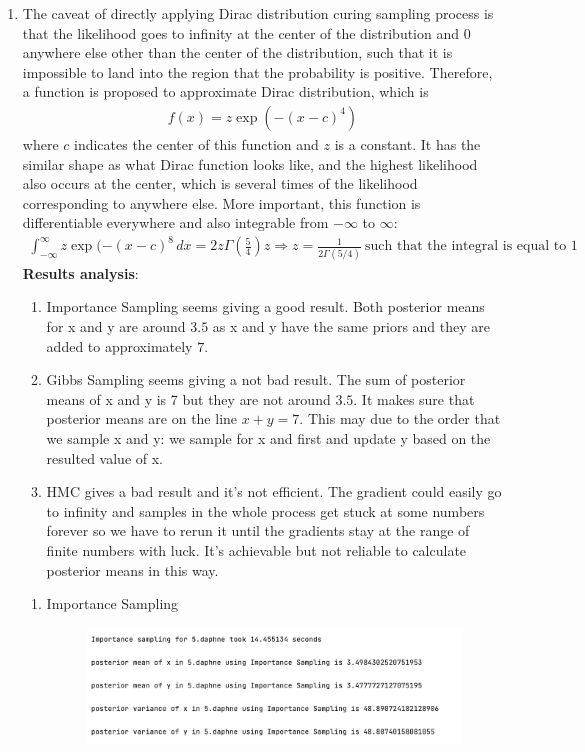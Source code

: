 \documentclass{article}
\begin{document}
\begin{enumerate}
\begin{enumerate}
\end{enumerate}
\newpage
\item The caveat of directly applying Dirac distribution curing sampling process is that the likelihood goes to infinity at the center of the distribution and 0 anywhere else other than the center of the distribution,  such that it is impossible to land into the region that the probability is positive. Therefore,  a function is proposed to approximate Dirac distribution,  which is 
\begin{align*}
f(x) = z\exp(-(x-c)^4)
\end{align*}
where $c$ indicates the center of this function and $z$ is a constant.  It has the similar shape as what Dirac function looks like,  and the highest likelihood also occurs at the center, which is several times of the likelihood corresponding to anywhere else.  More important, this function is differentiable everywhere and also integrable from $-\infty$ to $\infty$:
\begin{align*}
\int_{-\infty}^\infty z\exp(-(x - c)^8\,dx = 2z\Gamma\left(\frac 54\right)z\Rightarrow z = \frac{1}{2\Gamma(5/4)}\ \text{such that the integral is equal to 1}
\end{align*} 
\textbf{Results analysis}: 
\begin{enumerate}
\item Importance Sampling seems giving a good result.  Both posterior means for x and y are around $3.5$ as x and y have the same priors and they are added to approximately $7$.
\item Gibbs Sampling seems giving a not bad result.  The sum of posterior means of x and y is 7 but they are not around $3.5$.  It makes sure that posterior means are on the line $x + y = 7$. This may due to the order that we sample x and y: we sample for x and first and update y based on the resulted value of x.
\item  HMC gives a bad result and it's not efficient.  The gradient could easily go to infinity and samples in the whole process get stuck at some numbers forever so we have to rerun it until the gradients stay at the range of finite numbers with luck.  It's achievable but not reliable to calculate posterior means in this way. 
\end{enumerate}

\hfill
\begin{enumerate}
\item Importance Sampling
\begin{figure}[!ht]
	\centering
	\includegraphics[scale=0.5]{../figs/IS/5_program_results}
\end{figure}


\end{enumerate}
\end{enumerate}
\end{document}
